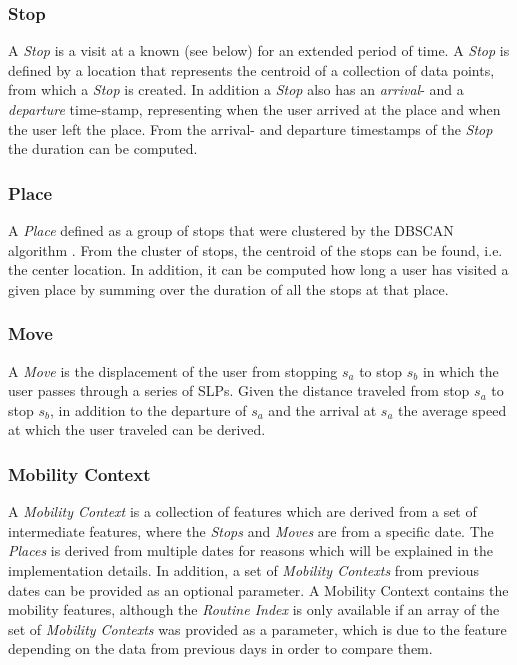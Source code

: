 \subsubsection*{Stop}
A \textit{Stop} is a visit at a known  (see below) for an extended period of time. A \textit{Stop} is defined by a location that represents the centroid of a collection of data points, from which a \textit{Stop} is created. In addition a \textit{Stop} also has an \textit{arrival}- and a \textit{departure} time-stamp, representing when the user arrived at the place and when the user left the place. From the arrival- and departure timestamps of the \textit{Stop} the duration can be computed.

\subsubsection*{Place}
A \textit{Place} defined as a group of stops that were clustered by the DBSCAN algorithm \cite{density-based-1996}. From the cluster of stops, the centroid of the stops can be found, i.e. the center location. In addition, it can be computed how long a user has visited a given place by summing over the duration of all the stops at that place.

\subsubsection*{Move}
A \textit{Move} is the displacement of the user from stopping $s_a$ to stop $s_b$ in which the user passes through a series of SLPs. Given the distance traveled from stop $s_a$ to stop $s_b$, in addition to the departure of $s_a$ and the arrival at $s_a$ the average speed at which the user traveled can be derived. 

\subsubsection*{Mobility Context}
A \textit{Mobility Context} is a collection of features which are derived from a set of intermediate features, where the \textit{Stops} and \textit{Moves} are from a specific date. The \textit{Places} is derived from multiple dates for reasons which will be explained in the implementation details. In addition, a set of \textit{Mobility Contexts} from previous dates can be provided as an optional parameter. A Mobility Context contains the mobility features, although the \textit{Routine Index} is only available if an array of the set of \textit{Mobility Contexts} was provided as a parameter, which is due to the feature depending on the data from previous days in order to compare them.

